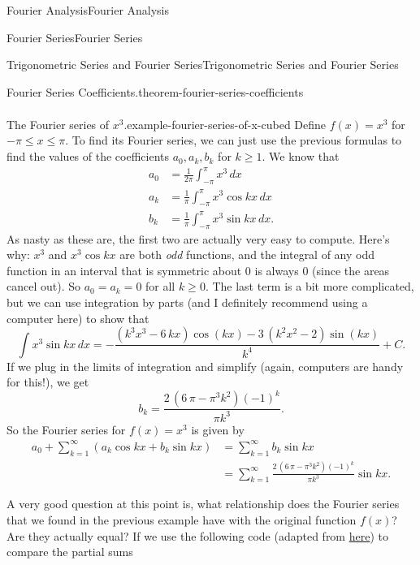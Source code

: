 \documentclass[10pt,]{book}
\numberwithin{equation}{section}
\begin{document}
\begin{chapterptx}{Fourier Analysis}{}{Fourier Analysis}{}{}
\begin{sectionptx}{Fourier Series}{}{Fourier Series}{}{}
\begin{subsectionptx}{Trigonometric Series and Fourier Series}{}{Trigonometric Series and Fourier Series}{}{}
\begin{theorem}{Fourier Series Coefficients.}{}{theorem-fourier-series-coefficients}
\begin{align*}
\end{align*}
%
\end{theorem}
\begin{example}{The Fourier series of \(x^{3}\).}{example-fourier-series-of-x-cubed}%
\hypertarget{p-389}{}%
Define \(f(x) = x^{3}\) for \(-\pi\leq x\leq \pi\). To find its Fourier series, we can just use the previous formulas to find the values of the coefficients \(a_{0},a_{k},b_{k}\) for \(k\geq1\). We know that%
\begin{align*}
a_{0} & = \frac{1}{2\pi}\int_{-\pi}^{\pi}x^{3}\,dx\\
a_{k} & = \frac{1}{\pi}\int_{-\pi}^{\pi}x^{3}\cos kx\,dx \\
b_{k} & = \frac{1}{\pi}\int_{-\pi}^{\pi}x^{3}\sin kx\,dx.
\end{align*}
As nasty as these are, the first two are actually very easy to compute. Here's why: \(x^{3}\) and \(x^{3}\cos kx\) are both \emph{odd} functions, and the integral of any odd function in an interval that is symmetric about \(0\) is always \(0\) (since the areas cancel out). So \(a_{0} = a_{k} = 0\) for all \(k\geq0\). The last term is a bit more complicated, but we can use integration by parts (and I definitely recommend using a computer here) to show that%
\begin{equation*}
\int x^{3}\sin kx\,dx = -\frac{{\left(k^{3} x^{3} - 6 \, k x\right)} \cos\left(k x\right) - 3 \, {\left(k^{2} x^{2} - 2\right)} \sin\left(k x\right)}{k^{4}} + C.
\end{equation*}
If we plug in the limits of integration and simplify (again, computers are handy for this!), we get%
\begin{equation*}
b_{k} = \frac{2 \, {\left(6 \, \pi - \pi^{3} k^{2}\right)} \left(-1\right)^{k}}{\pi k^{3}}.
\end{equation*}
So the Fourier series for \(f(x) = x^{3}\) is given by%
\begin{align*}
a_{0} + \sum_{k=1}^{\infty}(a_{k}\cos kx+b_{k}\sin kx) &= \sum_{k=1}^{\infty}b_{k}\sin kx \\
&= \sum_{k=1}^{\infty}\frac{2 \, {\left(6 \, \pi - \pi^{3} k^{2}\right)} \left(-1\right)^{k}}{\pi k^{3}}\sin kx. 
\end{align*}
%
\end{example}
\hypertarget{p-390}{}%
A very good question at this point is, what relationship does the Fourier series that we found in the previous example have with the original function \(f(x)\)? Are they actually equal? If we use the following code (adapted from \href{https://doxdrum.wordpress.com/2011/01/31/sage-tip-fourier-series-approximation/}{here}) to compare the partial sums%

\end{subsectionptx}
\end{sectionptx}
\end{chapterptx}
\end{document}
